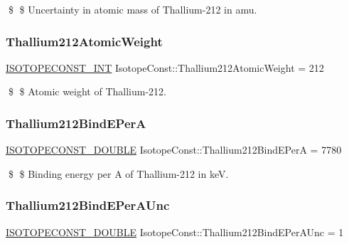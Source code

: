 \$ \$ Uncertainty in atomic mass of Thallium-\/212 in amu. \mbox{\label{group___isotope_const-_thallium-_tl212_gae3d37d7d04c17c757f90836bb70bdbaa}} 
\subsubsection{\texorpdfstring{Thallium212\+Atomic\+Weight}{Thallium212AtomicWeight}}
{\footnotesize\ttfamily \mbox{\hyperlink{group___isotope_const-_macros_ga5f18360b3e99483a35c32d789e62621c}{I\+S\+O\+T\+O\+P\+E\+C\+O\+N\+S\+T\+\_\+\+I\+NT}} Isotope\+Const\+::\+Thallium212\+Atomic\+Weight = 212}

\$ \$ Atomic weight of Thallium-\/212. \mbox{\label{group___isotope_const-_thallium-_tl212_ga5a2faee46259a1cc4fbeb9755ae0d6d0}} 
\subsubsection{\texorpdfstring{Thallium212\+Bind\+E\+PerA}{Thallium212BindEPerA}}
{\footnotesize\ttfamily \mbox{\hyperlink{group___isotope_const-_macros_ga8f45a7272ce02c0b4c65c44636ed719a}{I\+S\+O\+T\+O\+P\+E\+C\+O\+N\+S\+T\+\_\+\+D\+O\+U\+B\+LE}} Isotope\+Const\+::\+Thallium212\+Bind\+E\+PerA = 7780}

\$ \$ Binding energy per A of Thallium-\/212 in keV. \mbox{\label{group___isotope_const-_thallium-_tl212_gaae5ad380139db74bc43f1df6b31165bd}} 
\subsubsection{\texorpdfstring{Thallium212\+Bind\+E\+Per\+A\+Unc}{Thallium212BindEPerAUnc}}
{\footnotesize\ttfamily \mbox{\hyperlink{group___isotope_const-_macros_ga8f45a7272ce02c0b4c65c44636ed719a}{I\+S\+O\+T\+O\+P\+E\+C\+O\+N\+S\+T\+\_\+\+D\+O\+U\+B\+LE}} Isotope\+Const\+::\+Thallium212\+Bind\+E\+Per\+A\+Unc = 1}

